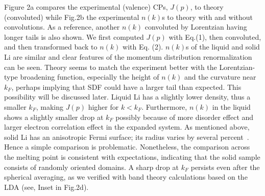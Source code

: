 \documentclass[twocolumn,showpacs,showkeys,fleqn,prl,superscriptaddress]{revtex4}%
\newcommand{\nn}[1]{\textnormal{ #1}}
\begin{document}
Figure 2a compares the experimental (valence) CPs, $J(p)$, to theory (convoluted) while Fig.2b the experimental $n(k)$s to theory with and without convolutions.
As a reference, another $n(k)$ convoluted by Lorentzian having longer tails is also shown.
We first computed  $J(p)$ with Eq.(1), then convoluted, and then transformed back to $n(k)$ with Eq. (2).
$n(k)$s of the liquid and solid Li are similar and clear features of the momentum distribution renormalization can be seen.
Theory seems to match the experiment better with the Lorentzian-type broadening function, especially the height of $n(k)$ and the curvature near $k_F$, perhaps implying that SDF could have a larger tail than expected.
This possibility will be discussed later.
Liquid Li has a slightly lower density, thus a smaller $k_F$, making $J(p)$ higher for $k < k_F$.
Furthermore, $n(k)$ in the liquid shows a slightly smaller drop at $ k_F $  possibly because of more disorder effect and  larger electron correlation effect in the expanded system.
As mentioned above, solid Li has an anisotropic Fermi surface; its radius varies by several percent~\cite{saku95,schulke96}. Hence a simple comparison is problematic.
Nonetheless, the comparison across the melting point is consistent with expectations, indicating that the solid sample consists of randomly oriented domains.
A sharp drop at $k_F$ persists even after the spherical averaging, as we verified with band theory calculations based on the LDA (see, Inset in Fig.2d).

\end{document}
